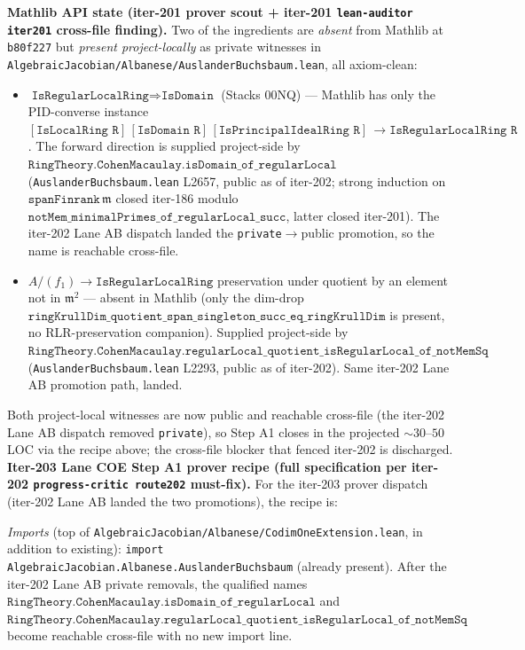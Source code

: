 \begin{itemize}
    \textbf{Mathlib API state (iter-201 prover scout + iter-201
    \texttt{lean-auditor iter201} cross-file finding).} Two of the
    ingredients are \emph{absent} from Mathlib at \texttt{b80f227} but
    \emph{present project-locally} as private witnesses in
    \texttt{AlgebraicJacobian/Albanese/AuslanderBuchsbaum.lean}, all
    axiom-clean:
    \begin{itemize}
      \item \(\texttt{IsRegularLocalRing} \Rightarrow \texttt{IsDomain}\)
        (Stacks 00NQ) --- Mathlib has only the PID-converse instance
        \([\texttt{IsLocalRing R}]\,[\texttt{IsDomain R}]\,
         [\texttt{IsPrincipalIdealRing R}]\,
         \to \texttt{IsRegularLocalRing R}\). The forward direction is
        supplied project-side by
        \(\texttt{RingTheory.CohenMacaulay.isDomain\_of\_regularLocal}\)
        (\texttt{AuslanderBuchsbaum.lean} L2657, public as of
        iter-202; strong induction on
        \(\texttt{spanFinrank}\,\mathfrak m\) closed iter-186 modulo
        \(\texttt{notMem\_minimalPrimes\_of\_regularLocal\_succ}\),
        latter closed iter-201). The iter-202 Lane AB dispatch
        landed the \texttt{private}\(\to\)public promotion, so the
        name is reachable cross-file.
      \item \(A / (f_1) \to \texttt{IsRegularLocalRing}\)
        preservation under quotient by an element not in
        \(\mathfrak m^2\) --- absent in Mathlib (only the dim-drop
        \(\texttt{ringKrullDim\_quotient\_span\_singleton\_succ\_eq\_ringKrullDim}\)
        is present, no RLR-preservation companion). Supplied
        project-side by
        \(\texttt{RingTheory.CohenMacaulay.regularLocal\_quotient\_isRegularLocal\_of\_notMemSq}\)
        (\texttt{AuslanderBuchsbaum.lean} L2293, public as of
        iter-202). Same iter-202 Lane AB promotion path, landed.
    \end{itemize}
    Both project-local witnesses are now public and reachable
    cross-file (the iter-202 Lane AB dispatch removed
    \texttt{private}), so Step A1 closes in the projected
    \(\sim 30\)--\(50\) LOC via the recipe above; the cross-file
    blocker that fenced iter-202 is discharged.
    \textbf{Iter-203 Lane COE Step A1 prover recipe (full
    specification per iter-202 \texttt{progress-critic route202}
    must-fix).} For the iter-203 prover dispatch (iter-202 Lane AB
    landed the two promotions), the recipe is:

    \emph{Imports} (top of
    \texttt{AlgebraicJacobian/Albanese/CodimOneExtension.lean}, in
    addition to existing): \texttt{import
    AlgebraicJacobian.Albanese.AuslanderBuchsbaum} (already present).
    After the iter-202 Lane AB private removals, the qualified names
    \(\texttt{RingTheory.CohenMacaulay.isDomain\_of\_regularLocal}\) and
    \(\texttt{RingTheory.CohenMacaulay.regularLocal\_quotient\_isRegularLocal\_of\_notMemSq}\)
    become reachable cross-file with no new import line.


\end{itemize}
